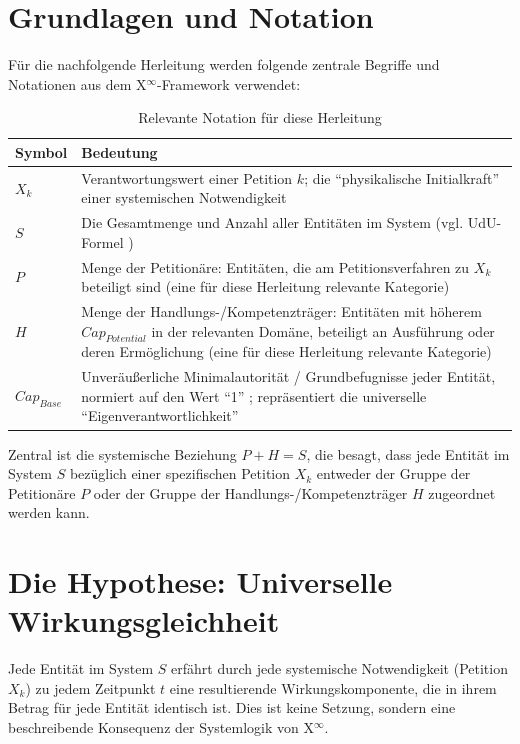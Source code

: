 \documentclass[12pt]{scrartcl}
\begin{document}
\section{Grundlagen und Notation}
Für die nachfolgende Herleitung werden folgende zentrale Begriffe und Notationen aus dem X$^\infty$-Framework verwendet:

\begin{table}[h!]
\centering
\caption{Relevante Notation für diese Herleitung}
\begin{tabular}{p{}p{}}
\toprule
Symbol & Bedeutung \\
\midrule
$X_k$ & Verantwortungswert einer Petition $k$; die \enquote{physikalische Initialkraft} einer systemischen Notwendigkeit \cite{Auctor:Zenodo15385150} \\
$S$ & Die Gesamtmenge und Anzahl aller Entitäten im System (vgl. UdU-Formel \cite{Auctor:Zenodo15385150, Auctor:Zenodo15368567}) \\ 
$P$ & Menge der Petitionäre: Entitäten, die am Petitionsverfahren zu $X_k$ beteiligt sind (eine für diese Herleitung relevante Kategorie) \\ 
$H$ & Menge der Handlungs-/Kompetenzträger: Entitäten mit höherem $Cap_{Potential}$ \cite{Auctor:Zenodo15385150} in der relevanten Domäne, beteiligt an Ausführung oder deren Ermöglichung (eine für diese Herleitung relevante Kategorie) \\
$Cap_{Base}$ & Unveräußerliche Minimalautorität / Grundbefugnisse jeder Entität, normiert auf den Wert \enquote{1} \cite{Auctor:Zenodo15385150}; repräsentiert die universelle \enquote{Eigenverantwortlichkeit} \\
\bottomrule
\end{tabular}
\end{table}
Zentral ist die systemische Beziehung $P+H=S$, die besagt, dass jede Entität im System $S$ bezüglich einer spezifischen Petition $X_k$ entweder der Gruppe der Petitionäre $P$ oder der Gruppe der Handlungs-/Kompetenzträger $H$ zugeordnet werden kann.

\section{Die Hypothese: Universelle Wirkungsgleichheit}
Jede Entität im System $S$ erfährt durch jede systemische Notwendigkeit (Petition $X_k$) zu jedem Zeitpunkt $t$ eine resultierende Wirkungskomponente, die in ihrem Betrag für jede Entität identisch ist. Dies ist keine Setzung, sondern eine beschreibende Konsequenz der Systemlogik von X$^\infty$.
\end{document}
